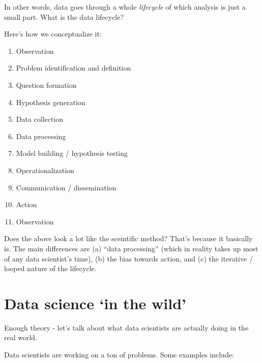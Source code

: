 \documentclass[
]{book}
\providecommand{\tightlist}{%
  \setlength{\itemsep}{0pt}\setlength{\parskip}{0pt}}
\begin{document}
In other words, data goes through a whole \emph{lifecycle} of which analysis is just a small part. What is the data lifecycle?

Here's how we conceptualize it:

\begin{enumerate}
\def\labelenumi{\arabic{enumi}.}
\setcounter{enumi}{-1}
\tightlist
\item
  Observation\\
\item
  Problem identification and definition\\
\item
  Question formation\\
\item
  Hypothesis generation\\
\item
  Data collection\\
\item
  Data processing\\
\item
  Model building / hypothesis testing\\
\item
  Operationalization\\
\item
  Communication / dissemination\\
\item
  Action\\
\item
  Observation
\end{enumerate}

Does the above look a lot like the sceintific method? That's because it basically is. The main differences are (a) ``data processing'' (which in reality takes up most of any data scientist's time), (b) the bias towards action, and (c) the iterative / looped nature of the lifecycle.

\hypertarget{data-science-in-the-wild}{%
\section*{Data science `in the wild'}\label{data-science-in-the-wild}}

Enough theory - let's talk about what data scientists are actually doing in the real world.

Data scientists are working on a ton of problems. Some examples include:
\end{document}
